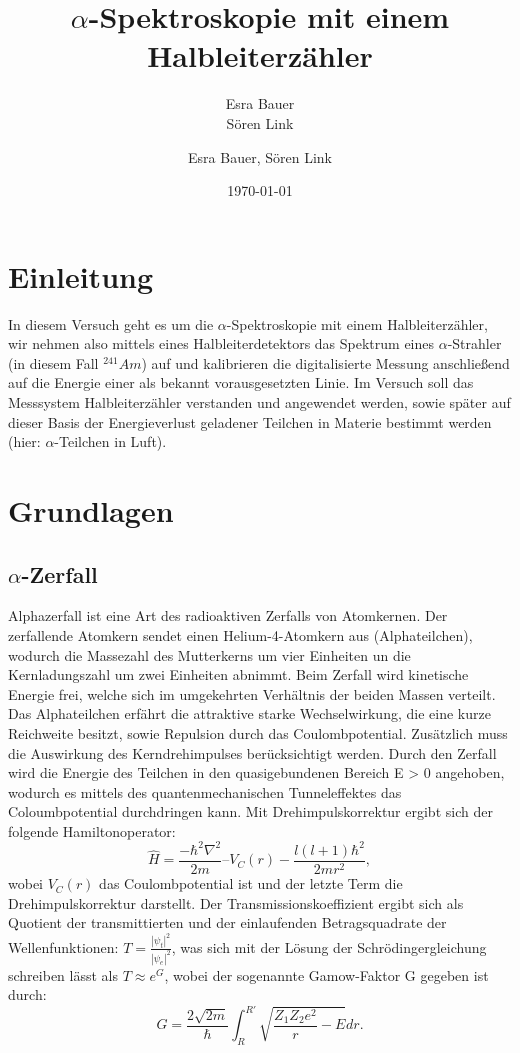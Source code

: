\documentclass[bigchapter,colorback,accentcolor=tud4b,linedtoc,11pt]{tudreport}
\title{$\alpha$-Spektroskopie mit einem Halbleiterzähler}
\subtitle{Esra Bauer \\Sören Link}
\author{Esra Bauer, Sören Link}
\date{\today}
\begin{document}

\maketitle

\tableofcontents


\chapter{Einleitung}

In diesem Versuch geht es um die $\alpha$-Spektroskopie mit einem Halbleiterzähler, wir nehmen also mittels eines Halbleiterdetektors das Spektrum eines $\alpha$-Strahler (in diesem Fall $^{241}Am$) auf und kalibrieren die digitalisierte Messung anschließend auf die Energie einer als bekannt vorausgesetzten Linie. Im Versuch soll das Messsystem Halbleiterzähler verstanden und angewendet werden, sowie später auf dieser Basis der Energieverlust geladener Teilchen in Materie bestimmt werden (hier: $\alpha$-Teilchen in Luft).

\chapter{Grundlagen}

\section{$\alpha$-Zerfall}

Alphazerfall ist eine Art des radioaktiven Zerfalls von Atomkernen. Der zerfallende Atomkern sendet einen Helium-4-Atomkern aus (Alphateilchen), wodurch die Massezahl des Mutterkerns um vier Einheiten un die Kernladungszahl um zwei Einheiten abnimmt. Beim Zerfall wird kinetische Energie frei, welche sich im umgekehrten Verhältnis der beiden Massen verteilt. Das Alphateilchen erfährt die attraktive starke Wechselwirkung, die eine kurze Reichweite besitzt, sowie Repulsion durch das Coulombpotential. Zusätzlich muss die Auswirkung des Kerndrehimpulses berücksichtigt werden. Durch den Zerfall wird die Energie des Teilchen in den quasigebundenen Bereich E > 0 angehoben, wodurch es mittels des quantenmechanischen Tunneleffektes das Coloumbpotential durchdringen kann. Mit Drehimpulskorrektur ergibt sich der folgende Hamiltonoperator: 
$$\hat{H} = \frac{-\hbar^2 \nabla^2}{2 m} – V_C(r) - \frac{l(l+1) \hbar^2}{2 m r^2},$$
wobei $V_C(r)$ das Coulombpotential ist und der letzte Term die Drehimpulskorrektur darstellt.
Der Transmissionskoeffizient ergibt sich als Quotient der transmittierten und der einlaufenden Betragsquadrate der Wellenfunktionen: $T = \frac{|\psi_t|^2}{|\psi_e|^2}$, was sich mit der Lösung der Schrödingergleichung schreiben lässt als $T \approx e^G$, wobei der sogenannte Gamow-Faktor G gegeben ist durch:
$$G = \frac{2 \sqrt{2 m}}{\hbar}\int_R^{R'} \sqrt{\frac{Z_1Z_2e^2}{r}-E} dr.$$
\end{document}
